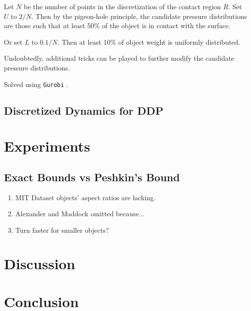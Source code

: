 \documentclass[conference]{IEEEtran}
\begin{document}
\begin{inparaenum}
  \begin{inparaenum}
  \item Let $N$ be the number of points in the discretization of the
    contact region $R$. Set $U$ to $2/N$. Then by the pigeon-hole
    principle, the candidate pressure distributions are those such
    that at least 50\% of the object is in contact with the surface.
  \item Or set $L$ to $0.1/N$. Then at least 10\% of object weight is
    uniformly distributed.
  \item Undoubtedly, additional tricks can be played to further modify
    the candidate pressure distributions.
  \end{inparaenum}
\item Solved using \texttt{Gurobi} \cite{gurobi}.
\end{inparaenum}

\subsection{Discretized Dynamics for DDP}

\begin{inparaenum}
\item 
\end{inparaenum}

\section{Experiments}\label{sec:experiments}

\begin{inparaenum}
\item 
\end{inparaenum}


\subsection{Exact Bounds vs Peshkin's Bound}
\begin{enumerate}
\item MIT Dataset objects' aspect ratios are lacking.
\item Alexander and Maddock omitted because...
\item Turn faster for smaller objects?
\end{enumerate}

\section{Discussion}

\section{Conclusion}



\end{document}
